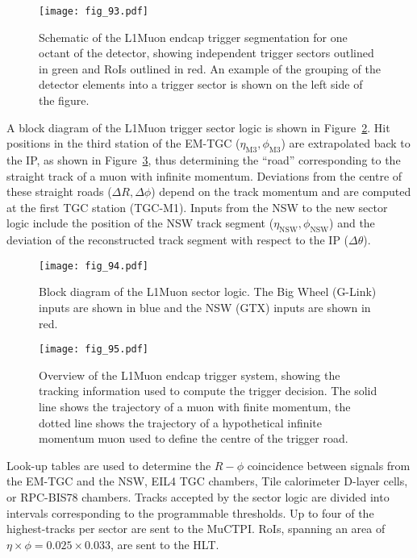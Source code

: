 \documentclass[cernpreprint, atlasdraft=false, UKenglish,british,orcidlogo, texmf, orcidlogo]{atlasdoc}
\begin{document}
\begin{figure}[htbp!]
\centerline{\texttt{[image: fig\_93.pdf]}}
\caption{Schematic of the \gls{L1Muon} endcap trigger segmentation for one octant of the detector, showing independent trigger sectors outlined in green and \glspl{RoI} outlined in red.  An example of the grouping of the detector elements into a trigger sector is shown on the left side of the figure.
}
\label{fig:TDAQL1MuonEndcapRoI}
\end{figure}
 
A block diagram of the \gls{L1Muon} trigger sector logic is shown in Figure~\ref{fig:TDAQL1MuonSectorLogic}.  Hit positions in the third station of the \gls{EM-TGC} ($\eta_{\mathrm{M3}}, \phi_{\mathrm{M3}}$) are extrapolated back to the \gls{IP}, as shown in Figure~\ref{fig:TDAQL1MuonEndcapTrigger}, thus determining the ``road'' corresponding to the straight track of a muon with infinite momentum.  Deviations from the centre of these straight roads ($\Delta R, \Delta\phi$) depend on the track momentum and are computed at the first \gls{TGC} station (\gls{TGC}-M1).
Inputs from the \gls{NSW} to the new sector logic include the position of the \gls{NSW} track segment ($\eta_{\mathrm{NSW}}, \phi_{\mathrm{NSW}}$) and the deviation of the reconstructed track segment with respect to the \gls{IP} ($\Delta\theta$).
 
\begin{figure}[htbp!]
\centerline{\texttt{[image: fig\_94.pdf]}}
\caption{Block diagram of the \gls{L1Muon} sector logic.  The Big Wheel (G-Link) inputs are shown in blue and the \gls{NSW} (GTX) inputs are shown in red.}
\label{fig:TDAQL1MuonSectorLogic}
\end{figure}
 
\begin{figure}[htbp!]
\centerline{\texttt{[image: fig\_95.pdf]}}
\caption{Overview of the \gls{L1Muon} endcap trigger system, showing the tracking information used to compute the trigger decision.
The solid line shows the trajectory of a muon with finite momentum, the dotted line shows the trajectory of a hypothetical infinite momentum muon used to define the centre of the trigger road.}
\label{fig:TDAQL1MuonEndcapTrigger}
\end{figure}
 
Look-up tables are used to determine the $R-\phi$ coincidence between signals from the \gls{EM-TGC} and the \gls{NSW}, \gls{EIL4} \gls{TGC} chambers, Tile calorimeter D-layer cells, or \gls{RPC-BIS78} chambers. Tracks accepted by the sector logic are divided into intervals corresponding to the programmable \pT thresholds.  Up to four of the highest-\pT tracks per sector are sent to the \gls{MuCTPI}.  \glspl{RoI}, spanning an area of $\eta \times \phi = 0.025 \times 0.033$, are sent to the \gls{HLT}.
 
\end{document}
